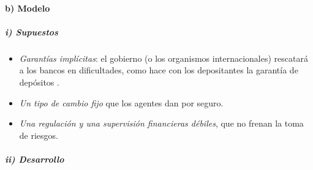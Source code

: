\documentclass[11pt]{article}
\begin{document}
\paragraph{b) Modelo}

\subparagraph{i) Supuestos}

\begin{itemize}
\item \emph{Garantías implícitas}: el gobierno (o los organismos internacionales) rescatará a los bancos en dificultades, como hace con los depositantes la garantía de depósitos .
\item \emph{Un tipo de cambio fijo} que los agentes dan por seguro.
\item \emph{Una regulación y una supervisión financieras débiles}, que no frenan la toma de riesgos.
\end{itemize}

\subparagraph{ii) Desarrollo}
\end{document}
